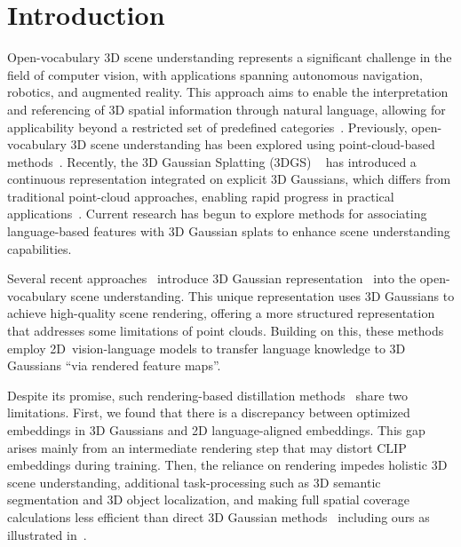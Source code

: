 \section{Introduction}
\label{sec:introduction}

Open-vocabulary 3D scene understanding represents a significant challenge in the field of computer vision, with applications spanning autonomous navigation, robotics, and augmented reality. 
This approach aims to enable the interpretation and referencing of 3D spatial information through natural language, allowing for applicability beyond a restricted set of predefined categories~\cite{point_transformer,point_mixer,point_next,mink,point_net,point_transformer_v3,super_point_trandsformer}. 
Previously, open-vocabulary 3D scene understanding has been explored using point-cloud-based methods~\cite{open_scene,regionplc,ov3d,openmask3d,openins3d,langsplat,lerf}. 
Recently, the 3D Gaussian Splatting (3DGS) ~\cite{3dgs} has introduced a continuous representation integrated on explicit 3D Gaussians, which differs from traditional point-cloud approaches, enabling rapid progress in practical applications~\cite{gaussian_grasper}. 
Current research has begun to explore methods for associating language-based features with 3D Gaussian splats to enhance scene understanding capabilities.



Several recent approaches~\cite{langsplat, legaussian, fmgs} introduce 3D Gaussian representation~\cite{3dgs} into the open-vocabulary scene understanding. 
This unique representation uses 3D Gaussians to achieve high-quality scene rendering, offering a more structured representation that addresses some limitations of point clouds. 
Building on this, these methods employ 2D~vision-language models to transfer language knowledge to 3D Gaussians ``via rendered feature maps''.

Despite its promise, such rendering-based distillation methods~\cite{langsplat, legaussian} share two limitations. First, we found that there is a discrepancy between optimized embeddings in 3D Gaussians and 2D language-aligned embeddings. This gap arises mainly from an intermediate rendering step that may distort CLIP embeddings during training. Then, the reliance on rendering impedes holistic 3D scene understanding, additional task-processing such as 3D semantic segmentation and 3D object localization, and making full spatial coverage calculations less efficient than direct 3D Gaussian methods~\cite{open_gaussian} including ours as illustrated in~.

